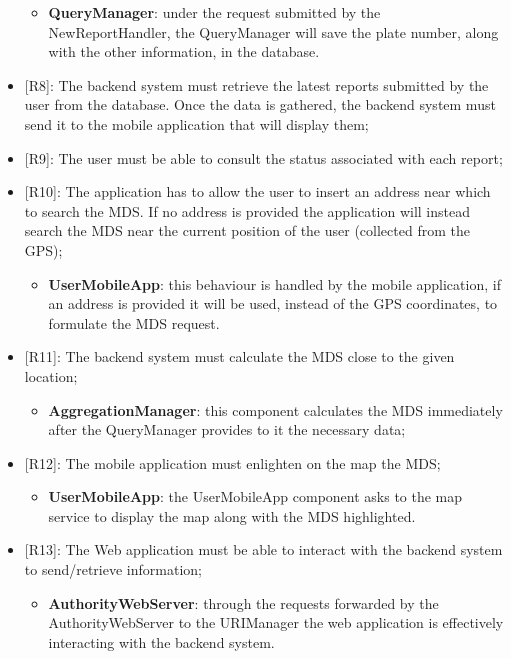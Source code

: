 \begin{itemize}
    \begin{itemize}
      \item \textbf{QueryManager}: under the request submitted by the NewReportHandler, the QueryManager will save the plate number, along with the other information, in the database. 
    \end{itemize} 
    \item {[R8]}: The backend system must retrieve the latest reports submitted by the user from the database. Once the data is gathered, the backend system must send it to the mobile application that will display them; 
    \item {[R9]}: The user must be able to consult the status associated with each report;
    \item {[R10]}: The application has to allow the user to insert an address near which to search the MDS. If no address is provided the application will instead search the MDS near the current position of the user (collected from the GPS);
    \begin{itemize}
      \item \textbf{UserMobileApp}: this behaviour is handled by the mobile application, if an address is provided it will be used, instead of the GPS coordinates, to formulate the MDS request.  
    \end{itemize} 
    \item {[R11]}: The backend system must calculate the MDS close to the given location;
    \begin{itemize}
      \item \textbf{AggregationManager}: this component calculates the MDS immediately after the QueryManager provides to it the necessary data; 
    \end{itemize} 
    \item {[R12]}: The mobile application must enlighten on the map the MDS;
    \begin{itemize}
      \item \textbf{UserMobileApp}: the UserMobileApp component asks to the map service to display the map along with the MDS highlighted.
    \end{itemize} 
    \item {[R13]}: The Web application must be able to interact with the backend system to send/retrieve information;
    \begin{itemize}
      \item \textbf{AuthorityWebServer}: through the requests forwarded by the AuthorityWebServer to the URIManager the web application is effectively interacting with the backend system.
    \end{itemize} 
    

\end{itemize}

